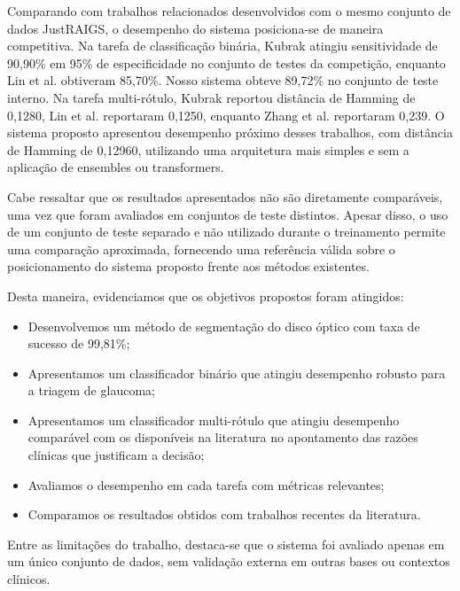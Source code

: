 \documentclass[12pt]{article}
\begin{document}
Comparando com trabalhos relacionados desenvolvidos com o mesmo conjunto de dados JustRAIGS, o desempenho do sistema posiciona-se de maneira competitiva.  
Na tarefa de classificação binária, Kubrak \cite{justraigs_kubrak} atingiu sensitividade de 90,90\% em 95\% de especificidade no conjunto de testes da competição, enquanto Lin et al. \cite{justraigs_hu_lin} obtiveram 85,70\%. Nosso sistema obteve 89,72\% no conjunto de teste interno.
Na tarefa multi-rótulo, Kubrak reportou distância de Hamming de 0,1280, Lin et al. \cite{justraigs_hu_lin} reportaram 0,1250, enquanto Zhang et al. \cite{justraigs_zhang} reportaram 0,239. O sistema proposto apresentou desempenho próximo desses trabalhos, com distância de Hamming de 0,12960, utilizando uma arquitetura mais simples e sem a aplicação de ensembles ou transformers.

Cabe ressaltar que os resultados apresentados não são diretamente comparáveis, uma vez que foram avaliados em conjuntos de teste distintos. Apesar disso, o uso de um conjunto de teste separado e não utilizado durante o treinamento permite uma comparação aproximada, fornecendo uma referência válida sobre o posicionamento do sistema proposto frente aos métodos existentes.

Desta maneira, evidenciamos que os objetivos propostos foram atingidos:
\begin{itemize}[noitemsep]
    \item Desenvolvemos um método de segmentação do disco óptico com taxa de sucesso de 99,81\%;
    \item Apresentamos um classificador binário que atingiu desempenho robusto para a triagem de glaucoma;
    \item Apresentamos um classificador multi-rótulo que atingiu desempenho comparável com os disponíveis na literatura no apontamento das razões clínicas que justificam a decisão;
    \item Avaliamos o desempenho em cada tarefa com métricas relevantes;
    \item Comparamos os resultados obtidos com trabalhos recentes da literatura.
\end{itemize}

Entre as limitações do trabalho, destaca-se que o sistema foi avaliado apenas em um único conjunto de dados, sem validação externa em outras bases ou contextos clínicos. %
\end{document}
